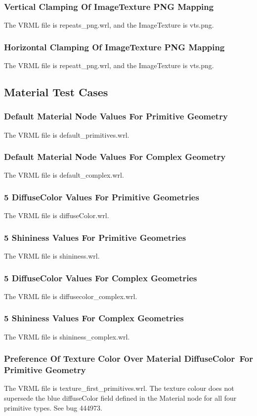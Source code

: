 \documentclass[12pt,letterpaper]{article}
\newcommand{\ITAG}{Vertical Clamping Of ImageTexture PNG Mapping}
\newcommand{\ITAH}{Horizontal Clamping Of ImageTexture PNG Mapping}
\newcommand{\MatA}{Default Material Node Values For Primitive Geometry}
\newcommand{\MatB}{Default Material Node Values For Complex Geometry}
\newcommand{\MatC}{5 DiffuseColor Values For Primitive Geometries}
\newcommand{\MatD}{5 Shininess Values For Primitive Geometries}
\newcommand{\MatE}{5 DiffuseColor Values For Complex Geometries}
\newcommand{\MatF}{5 Shininess Values For Complex Geometries}
\newcommand{\MatGa}{Preference Of Texture Color Over Material DiffuseColor~}
\newcommand{\MatGb}{For Primitive Geometry}
\begin{document}
\subsubsection{\ITAG}
The VRML file is repeats\_png.wrl, and the ImageTexture is vts.png.

\subsubsection{\ITAH}
The VRML file is repeatt\_png.wrl, and the ImageTexture is vts.png.

\subsection{Material Test Cases}

\subsubsection{\MatA}
The VRML file is default\_primitives.wrl.

\subsubsection{\MatB}
The VRML file is default\_complex.wrl.

\subsubsection{\MatC}
The VRML file is diffuseColor.wrl.

\subsubsection{\MatD}
The VRML file is shininess.wrl.

\subsubsection{\MatE}
The VRML file is diffusecolor\_complex.wrl.

\subsubsection{\MatF}
The VRML file is shininess\_complex.wrl.

\subsubsection{\MatGa\MatGb}
\label{sec:pref-colour}
The VRML file is texture\_first\_primitives.wrl.\newline
The texture colour does not supersede the blue diffuseColor field defined in the Material
node for all four primitive types.
See bug 444973.
\end{document}
